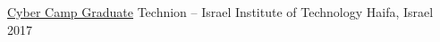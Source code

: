

\begin{cvhonors}

  \cvhonor
    {\href{https://cont-edu.technion.ac.il/programs/cyber/cyber-camp-2/}{\underline{Cyber Camp Graduate}}} %
    {Technion – Israel Institute of Technology} %
    {Haifa, Israel} %
    {2017} %


\end{cvhonors}